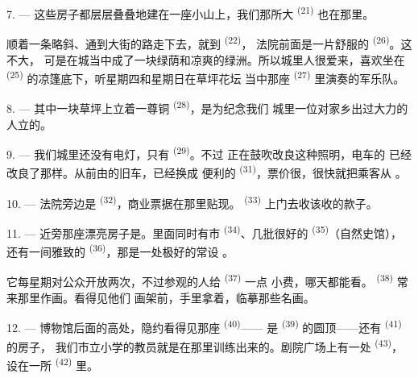 7. --- 这些房子都层层叠叠地建在一座小山上，我们那所大
\textsuperscript{(21)} 也在那里。

顺着一条略斜、通到大街的路走下去，就到 \textsuperscript{(22)}，
法院前面是一片舒服的 \textsuperscript{(26)}。这不大，
可是在城当中成了一块绿荫和凉爽的绿洲。所以城里人很爱来，喜欢坐在
 \textsuperscript{(25)} 的凉篷底下，听星期四和星期日在草坪花坛
当中那座 \textsuperscript{(27)} 里演奏的军乐队。

8. --- 其中一块草坪上立着一尊铜 \textsuperscript{(28)}，是为纪念我们
城里一位对家乡出过大力的人立的。

\VUsaut{4.0mm}
\VUsaut{3.4mm}

9. --- 我们城里还没有电灯，只有 \textsuperscript{(29)}。不过
正在鼓吹改良这种照明，电车的
已经改良了那样。从前由的旧车，已经换成
便利的 \textsuperscript{(31)}，票价很，很快就把乘客从
。

10. --- 法院旁边是 \textsuperscript{(32)}，商业票据在那里贴现。
 \textsuperscript{(33)} 上门去收该收的款子。

\VUsaut{4.0mm}
\VUsaut{3.4mm}

11. --- 近旁那座漂亮房子是。里面同时有市
\textsuperscript{(34)}、几批很好的 \textsuperscript{(35)}（自然史馆），
还有一间雅致的 \textsuperscript{(36)}，那是一处极好的常设
。

它每星期对公众开放两次，不过参观的人给 \textsuperscript{(37)} 一点
小费，哪天都能看。 \textsuperscript{(38)} 常来那里作画。看得见他们
画架前，手里拿着，临摹那些名画。

12. --- 博物馆后面的高处，隐约看得见那座 \textsuperscript{(40)}——
是 \textsuperscript{(39)} 的圆顶——还有
\textsuperscript{(41)} 的房子，
我们市立小学的教员就是在那里训练出来的。剧院广场上有一处
\textsuperscript{(43)}，设在一所 \textsuperscript{(42)} 里。

\VUsaut{5.0mm}
\VUsaut{3.0mm}

